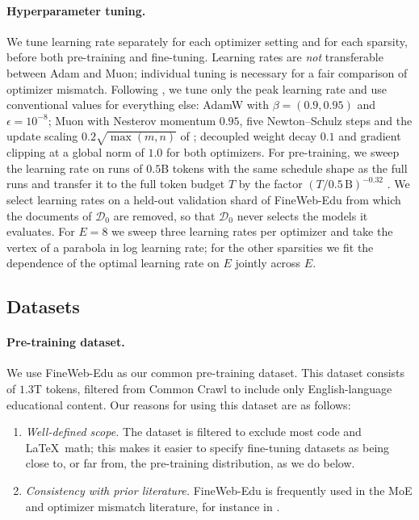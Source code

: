 \documentclass[11pt,a4paper]{article}
\newcommand{\D}{\mathcal{D}}
\begin{document}
\paragraph{Hyperparameter tuning.} We tune learning rate separately for each optimizer setting and for each sparsity, before both pre-training and fine-tuning. Learning rates are \textit{not} transferable between Adam and Muon; individual tuning is necessary for a fair comparison of optimizer mismatch. Following \cite{wen2025fantasticpretrainingoptimizers}, we tune only the peak learning rate and use conventional values for everything else: AdamW with $\beta = (0.9, 0.95)$ and $\epsilon = 10^{-8}$; Muon with Nesterov momentum $0.95$, five Newton--Schulz steps and the update scaling $0.2\sqrt{\max(m,n)}$ of \cite{liu2025muon}; decoupled weight decay $0.1$ and gradient clipping at a global norm of $1.0$ for both optimizers. For pre-training, we sweep the learning rate on runs of $0.5$B tokens with the same schedule shape as the full runs and transfer it to the full token budget $T$ by the factor $(T/0.5\,\text{B})^{-0.32}$ \cite{hernanz2026muonmakesmixtureofexpertslayer}. We select learning rates on a held-out validation shard of FineWeb-Edu from which the documents of $\D_0$ are removed, so that $\D_0$ never selects the models it evaluates. For $E=8$ we sweep three learning rates per optimizer and take the vertex of a parabola in log learning rate; for the other sparsities we fit the dependence of the optimal learning rate on $E$ jointly across $E$.

\subsection{Datasets} \label{sec:datasets}
\paragraph{Pre-training dataset.} We use FineWeb-Edu \cite{penedo2024finewebdatasetsdecantingweb} as our common pre-training dataset. This dataset consists of $1.3$T tokens, filtered from Common Crawl to include only English-language educational content. Our reasons for using this dataset are as follows:
\begin{enumerate}[label=\alph*)]
    \item \textit{Well-defined scope.} The dataset is filtered to exclude most code and \LaTeX\ math; this makes it easier to specify fine-tuning datasets as being close to, or far from, the pre-training distribution, as we do below.
    \item \textit{Consistency with prior literature.} FineWeb-Edu is frequently used in the MoE and optimizer mismatch literature, for instance in \cite{qu2026canmuon, hernanz2026muonmakesmixtureofexpertslayer, ludziejewski2025jointmoescalinglaws}.
\end{enumerate}
\end{document}
